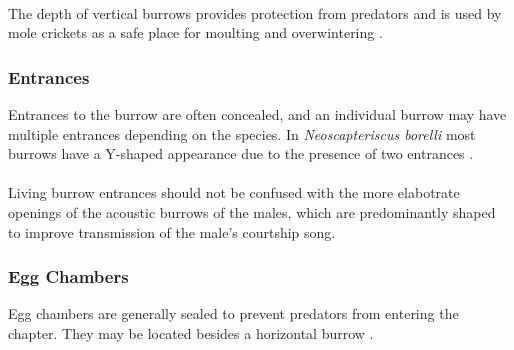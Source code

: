 \documentclass{article}
\begin{document}
   \paragraph{}
   The depth of vertical burrows provides protection from predators and is used by mole crickets as a safe place for moulting and overwintering \cite{endo2007}.
   
   \subsubsection{Entrances}
   Entrances to the burrow are often concealed, and an individual burrow may have multiple entrances depending on the species. In \textit{Neoscapteriscus borelli} most burrows have a Y-shaped appearance due to the presence of two entrances \cite{brandenburg2002}.
   \paragraph{}
   Living burrow entrances should not be confused with the more elabotrate openings of the acoustic burrows of the males, which are predominantly shaped to improve transmission of the male's courtship song.
   
   \subsubsection{Egg Chambers}
   Egg chambers are generally sealed to prevent predators from entering the chapter. They may be located besides a horizontal burrow \cite{endo2007}.
   
   
   
\end{document}
